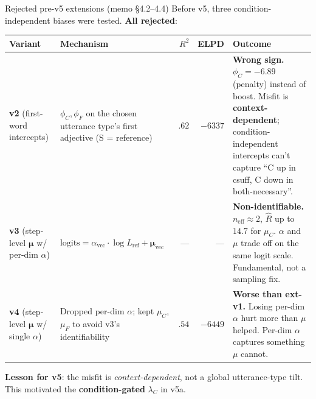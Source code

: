 \documentclass[10pt,aspectratio=169]{beamer}
\newcommand{\main}[1]{\textcolor{CSP-main-dark}{\textbf{#1}}}
\newcommand{\emp}[1]{\textcolor{CSP-emphasis}{\textbf{#1}}}
\newcommand{\muted}[1]{\textcolor{CSP-text-light}{#1}}
\begin{document}
\begin{frame}{Rejected pre-v5 extensions (memo \S4.2--4.4)}
\footnotesize
Before v5, three condition-independent biases were tested. \emp{All rejected}:

\vspace{0.6em}
\begin{center}
\renewcommand{\arraystretch}{1.3}
\begin{tabular}{p{2.0cm} p{4.6cm} rr p{5.0cm}}
\toprule
Variant & Mechanism & $R^2$ & ELPD & Outcome \\
\midrule
\emp{v2} \muted{(first-word intercepts)} &
$\phi_C, \phi_F$ on the chosen utterance type's first adjective (S = reference) &
$.62$ & $-6337$ &
\emp{Wrong sign.} $\phi_C = -6.89$ (penalty) instead of boost. Misfit is \main{context-dependent}; condition-independent intercepts can't capture ``C up in csuff, C down in both-necessary''. \\
\midrule
\emp{v3} \muted{(step-level $\bm{\mu}$ w/ per-dim $\alpha$)} &
$\text{logits} = \alpha_\text{vec} \cdot \log L_\text{ref} + \bm{\mu}_\text{vec}$ &
--- & --- &
\emp{Non-identifiable.} $n_\text{eff} \approx 2$, $\hat R$ up to $14.7$ for $\mu_C$. $\alpha$ and $\mu$ trade off on the same logit scale. Fundamental, not a sampling fix. \\
\midrule
\emp{v4} \muted{(step-level $\bm{\mu}$ w/ single $\alpha$)} &
Dropped per-dim $\alpha$; kept $\mu_C$, $\mu_F$ to avoid v3's identifiability &
$.54$ & $-6449$ &
\emp{Worse than ext-v1.} Losing per-dim $\alpha$ hurt more than $\mu$ helped. Per-dim $\alpha$ captures something $\mu$ cannot. \\
\bottomrule
\end{tabular}
\end{center}

\vspace{0.5em}
\main{Lesson for v5}: the misfit is \emph{context-dependent}, not a global utterance-type tilt. This motivated the \emp{condition-gated} $\lambda_C$ in v5a.
\end{frame}
\end{document}
